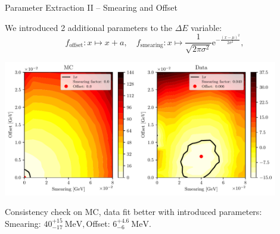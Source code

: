 \documentclass[serif]{beamer}
\newcommand {\e}[1]{\mathrm{~#1}}
\begin{document}

\begin{frame}[t]{Parameter Extraction II -- Smearing and Offset}
\vspace{-3mm}
\small

We introduced 2 additional parameters to the $\Delta E$ variable:
$$
f_{\mathrm{offset}}: x \mapsto x + a, \quad
f_{\mathrm{smearing}}: x \mapsto \frac{1}{\sqrt{2\pi \sigma^2}} \mathrm{e}^{-\frac{(x-\mu)^2}{2\sigma^2}},
$$
\vspace{-5mm}
\begin{center}
	\includegraphics[width=0.9\textwidth]{fig/smearing_offset}
\end{center}
\vspace{-3.5mm}
Consistency check on MC, data fit better with introduced parameters:\\
Smearing: $40_{-17}^{+15}\e{MeV},$\quad Offset: $6_{-6}^{+4.6}\e{MeV}$.

\end{frame}

\end{document}
